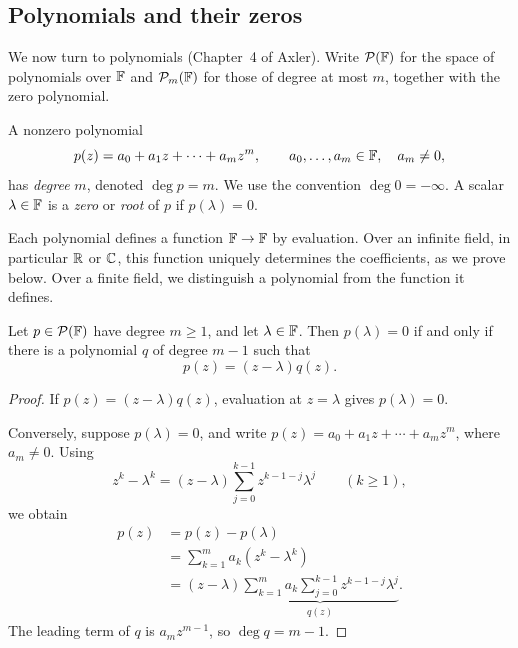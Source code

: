 \subsection{Polynomials and their zeros}

We now turn to polynomials (Chapter~4 of Axler). Write
$\mathcal P(\mathbb{F})$ for the space of polynomials over $\mathbb{F}$ and
$\mathcal P_m(\mathbb{F})$ for those of degree at most $m$, together with
the zero polynomial.

\begin{definition}
  A nonzero polynomial
  \[
    p(z)=a_0+a_1z+\cdots+a_mz^m,
    \qquad a_0,\ldots,a_m\in\mathbb{F},\quad a_m\neq0,
  \]
  has \emph{degree} $m$, denoted $\deg p=m$. We use the convention
  $\deg 0=-\infty$. A scalar $\lambda\in\mathbb{F}$ is a \emph{zero}
  or \emph{root} of $p$ if $p(\lambda)=0$.
\end{definition}

Each polynomial defines a function $\mathbb{F}\to\mathbb{F}$ by evaluation.
Over an infinite field, in particular $\mathbb{R}$ or $\mathbb{C}$, this
function uniquely determines the coefficients, as we prove below.
Over a finite field, we distinguish a polynomial from the function
it defines.

\begin{proposition}\label{prop:polynomial-factor-theorem}
  Let $p\in\mathcal P(\mathbb{F})$ have degree $m\geq1$, and let
  $\lambda\in\mathbb{F}$. Then $p(\lambda)=0$ if and only if there is
  a polynomial $q$ of degree $m-1$ such that
  \[
    p(z)=(z-\lambda)q(z).
  \]
\end{proposition}

\begin{proof}
  If $p(z)=(z-\lambda)q(z)$, evaluation at $z=\lambda$ gives
  $p(\lambda)=0$.

  Conversely, suppose $p(\lambda)=0$, and write
  $p(z)=a_0+a_1z+\cdots+a_mz^m$, where $a_m\neq0$. Using
  \[
    z^k-\lambda^k
      =(z-\lambda)\sum_{j=0}^{k-1}z^{k-1-j}\lambda^j
      \qquad(k\geq1),
  \]
  we obtain
  \begin{align*}
    p(z)&=p(z)-p(\lambda)\\
      &=\sum_{k=1}^m a_k(z^k-\lambda^k)\\
      &=(z-\lambda)
        \underbrace{\sum_{k=1}^m a_k
          \sum_{j=0}^{k-1}z^{k-1-j}\lambda^j}_{q(z)}.
  \end{align*}
  The leading term of $q$ is $a_mz^{m-1}$, so $\deg q=m-1$.
\end{proof}

